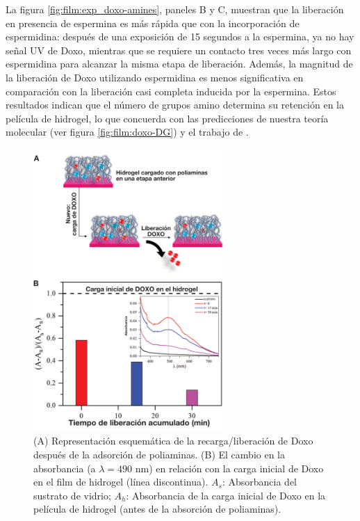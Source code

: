La figura \ref{fig:film:exp_doxo-amines}, paneles  B y C, muestran que la liberaci\'on en presencia de espermina es m\'as r\'apida que con la incorporaci\'on de espermidina: despu\'es de una exposici\'on de 15 segundos a la espermina, ya no hay se\~nal UV de Doxo, mientras que se requiere un contacto tres veces m\'as largo con espermidina para alcanzar la misma etapa de liberaci\'on. Adem\'as, la magnitud de la liberaci\'on de Doxo utilizando espermidina es menos significativa en comparaci\'on con la liberaci\'on casi completa inducida por la espermina. Estos resultados indican que el n\'umero de grupos amino determina su retenci\'on en la pel\'icula de hidrogel, lo que concuerda con las predicciones de nuestra teor\'ia molecular (ver figura \ref{fig:film:doxo-DG}) y el trabajo de \citet{Schimka2017}.


\begin{figure}[!htb]
	\centering
	\includegraphics[width=0.65\textwidth]{Figures/graph-film/fig12.pdf}
	\caption{(A) Representaci\'on esquem\'atica de la recarga/liberaci\'on de Doxo despu\'es de la adsorci\'on de poliaminas. (B) El cambio en la absorbancia (a $\lambda=490$ nm) en relaci\'on con la carga inicial de Doxo en el film de hidrogel (l\'inea discontinua). $A_s$: Absorbancia del sustrato de vidrio; $A_h$: Absorbancia de la carga inicial de Doxo en la pel\'icula de hidrogel (antes de la absorci\'on de poliaminas).}
	\label{fig:film:exp_doxo-reload}
\end{figure}


